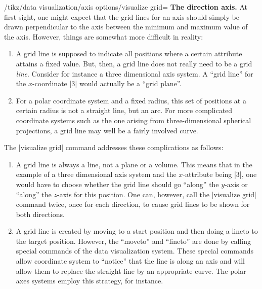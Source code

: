 \begin{key}{/tikz/data visualization/axis options/visualize grid=}
    \medskip
    \textbf{The direction axis.}
    At first sight, one might expect that the grid lines for an axis should
    simply be drawn perpendicular to the axis between the minimum and maximum
    value of the axis. However, things are somewhat more difficult in reality:
    \begin{enumerate}
        \item A grid line is supposed to indicate all positions where a certain
            attribute attains a fixed value. But, then, a grid line does not
            really need to be a grid \emph{line}. Consider for instance a three
            dimensional axis system. A ``grid line'' for the $x$-coordinate |3|
            would actually be a ``grid plane''.
        \item For a polar coordinate system and a fixed radius, this set of
            positions at a certain radius is not a straight line, but an arc.
            For more complicated coordinate systems such as the one arising
            from three-dimensional spherical projections, a grid line may well
            be a fairly involved curve.
    \end{enumerate}
    The |visualize grid| command addresses these complications as follows:
    \begin{enumerate}
        \item A grid line is always a line, not a plane or a volume. This means
            that in the example of a three dimensional axis system and the
            $x$-attribute being |3|, one would have to choose whether the grid
            line should go ``along'' the $y$-axis or ``along'' the $z$-axis for
            this position. One can, however, call the |visualize grid| command
            twice, once for each direction, to cause grid lines to be shown for
            both directions.
        \item A grid line is created by moving to a start position and then
            doing a lineto to the target position. However, the ``moveto'' and
            ``lineto'' are done by calling special commands of the data
            visualization system. These special commands allow coordinate
            system to ``notice'' that the line is along an axis and will allow
            them to replace the straight line by an appropriate curve. The
            polar axes systems employ this strategy, for instance.
    \end{enumerate}


\end{key}

